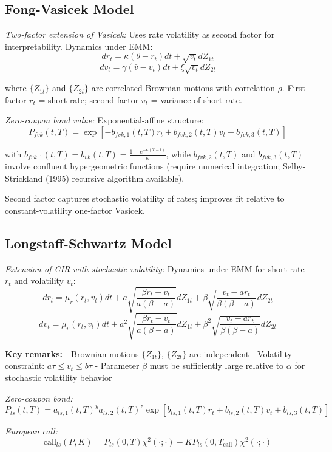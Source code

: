 \documentclass[12pt,a4paper]{article}
\begin{document}
\subsection{Fong-Vasicek Model}

\textit{Two-factor extension of Vasicek:} Uses rate volatility as second factor for interpretability. Dynamics under EMM:
$$dr_t = \kappa(\theta - r_t)dt + \sqrt{v_t}dZ_{1t}$$
$$dv_t = \gamma(\bar{v} - v_t)dt + \xi\sqrt{v_t}dZ_{2t}$$

where $\{Z_{1t}\}$ and $\{Z_{2t}\}$ are correlated Brownian motions with correlation $\rho$. First factor $r_t$ = short rate; second factor $v_t$ = variance of short rate.

\textit{Zero-coupon bond value:} Exponential-affine structure:
$$P_{fvk}(t,T) = \exp[-b_{fvk,1}(t,T)r_t + b_{fvk,2}(t,T)v_t + b_{fvk,3}(t,T)]$$

with $b_{fvk,1}(t,T) = b_{vk}(t,T) = \frac{1 - e^{-\kappa(T-t)}}{\kappa}$, while $b_{fvk,2}(t,T)$ and $b_{fvk,3}(t,T)$ involve confluent hypergeometric functions (require numerical integration; Selby-Strickland (1995) recursive algorithm available).

Second factor captures stochastic volatility of rates; improves fit relative to constant-volatility one-factor Vasicek.

\subsection{Longstaff-Schwartz Model}

\textit{Extension of CIR with stochastic volatility:} Dynamics under EMM for short rate $r_t$ and volatility $v_t$:
$$dr_t = \mu_r(r_t, v_t)dt + a\sqrt{\frac{\beta r_t - v_t}{a(\beta - a)}}dZ_{1t} + \beta\sqrt{\frac{v_t - ar_t}{\beta(\beta - a)}}dZ_{2t}$$
$$dv_t = \mu_v(r_t, v_t)dt + a^2\sqrt{\frac{\beta r_t - v_t}{a(\beta - a)}}dZ_{1t} + \beta^2\sqrt{\frac{v_t - ar_t}{\beta(\beta - a)}}dZ_{2t}$$


\textbf{Key remarks:} 
- Brownian motions $\{Z_{1t}\}$, $\{Z_{2t}\}$ are independent
- Volatility constraint: $a\tau \leq v_t \leq b\tau$
- Parameter $\beta$ must be sufficiently large relative to $\alpha$ for stochastic volatility behavior

\textit{Zero-coupon bond:}
$$P_{ls}(t,T) = a_{ls,1}(t,T)^y a_{ls,2}(t,T)^z\exp[b_{ls,1}(t,T)r_t + b_{ls,2}(t,T)v_t + b_{ls,3}(t,T)]$$

\textit{European call:}
$$\text{call}_{ls}(P,K) = P_{ls}(0,T)\chi^2(\cdot;\cdot) - KP_{ls}(0,T_{\text{call}})\chi^2(\cdot;\cdot)$$
\end{document}
